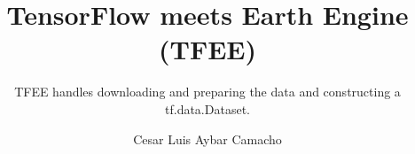 \documentclass{charite}
\author{Cesar Luis Aybar Camacho %
}
\title{TensorFlow meets Earth Engine (TFEE)}
\subtitle{TFEE handles downloading and preparing the data and constructing a tf.data.Dataset.}
\begin{document}
    
	\charitetitle
\end{document}
